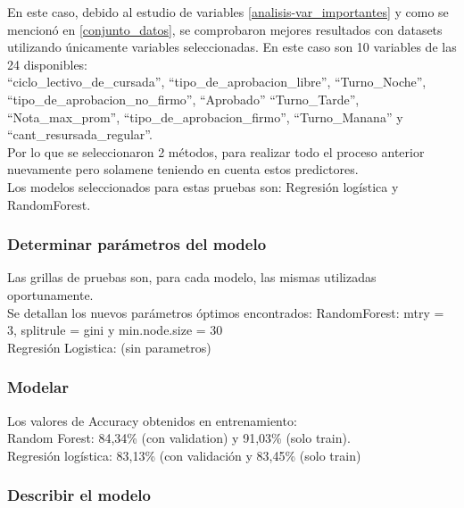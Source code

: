 En este caso, debido al estudio de variables \ref{analisis-var_importantes} y como se mencionó en \ref{conjunto_datos}, se comprobaron mejores resultados
con datasets utilizando únicamente variables seleccionadas. En este caso son 10 variables de las 24 disponibles:\\

``ciclo\_lectivo\_de\_cursada'', ``tipo\_de\_aprobacion\_libre'',
``Turno\_Noche'', ``tipo\_de\_aprobacion\_no\_firmo'', ``Aprobado''
``Turno\_Tarde'', ``Nota\_max\_prom'', ``tipo\_de\_aprobacion\_firmo'',
``Turno\_Manana'' y ``cant\_resursada\_regular''.\\


Por lo que se seleccionaron 2 métodos, para realizar todo el proceso
anterior nuevamente pero solamene teniendo en cuenta estos predictores.\\


Los modelos seleccionados para estas pruebas son: Regresión logística y
RandomForest.


\subsubsection{Determinar parámetros del modelo}

Las grillas de pruebas son, para cada modelo, las mismas utilizadas oportunamente.\\

Se detallan los nuevos parámetros óptimos encontrados: 
RandomForest: mtry = 3, splitrule = gini y min.node.size = 30\\
Regresión Logistica: (sin parametros)

\subsubsection{Modelar}

Los valores de Accuracy obtenidos en entrenamiento:\\
Random Forest: 84,34\% (con validation) y 91,03\% (solo train).\\
Regresión logística: 83,13\% (con validación y 83,45\% (solo train)



\subsubsection{Describir el modelo}

